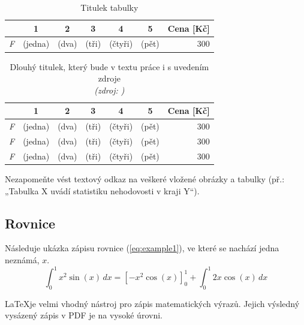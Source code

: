 \begin{table}[ht]
  \caption{Titulek tabulky}
  \label{tab:example1}
  \centering
  \begin{tabular}{|l|c|c|c|c|c|r|}
    \hline
    & 1 & 2 & 3 & 4 & 5 & Cena [Kč] \\ \hline
    \emph{F} & (jedna) & (dva) & (tři) & (čtyři) & (pět) & 300 \\ \hline
  \end{tabular}
\end{table}

\begin{table}[hbt]
  \caption[Krátký titulek do seznamu tabulek]{Dlouhý titulek, který bude v textu práce i s uvedením zdroje \\ \textnormal{\textit{(zdroj: \citealp{VizualUTB2023})}}}
  \label{tab:example2}
  \centering   
  \begin{tabular}{|l|c|c|c|c|c|r|}
    \hline
     & 1 & 2 & 3 & 4 & 5 & Cena [Kč] \\ \hline
    \emph{F} & (jedna) & (dva) & (tři) & (čtyři) & (pět) & 300 \\ \hline
    \emph{F} & (jedna) & (dva) & (tři) & (čtyři) & (pět) & 300 \\ \hline
    \emph{F} & (jedna) & (dva) & (tři) & (čtyři) & (pět) & 300 \\ \hline
  \end{tabular}
\end{table}

\noindent
Nezapomeňte vést textový odkaz na veškeré vložené obrázky a tabulky (př.: „Tabulka X uvádí statistiku nehodovosti v kraji Y“).


\subsection{Rovnice}
Následuje ukázka zápisu rovnice (\ref{eq:example1}), ve které se nachází jedna neznámá, $x$.
\begin{equation}
    \label{eq:example1}
    \int_0^1 x^2 \sin(x) \, dx = \left[ -x^2 \cos(x) \right]_0^1 + \int_0^1 2x \cos(x) \, dx
\end{equation}

\noindent
\LaTeX je velmi vhodný nástroj pro zápis matematických výrazů. Jejich výsledný vysázený zápis v PDF je na vysoké úrovni.

